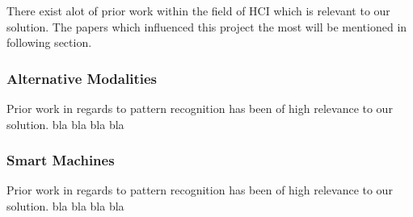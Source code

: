There exist alot of prior work within the field of HCI which is relevant to our solution.
The papers which influenced this project the most will be mentioned in following section.

\subsubsection{Alternative Modalities}
Prior work in regards to pattern recognition has been of high relevance to our solution.
bla bla bla bla

\subsubsection{Smart Machines}
Prior work in regards to pattern recognition has been of high relevance to our solution.
bla bla bla bla

